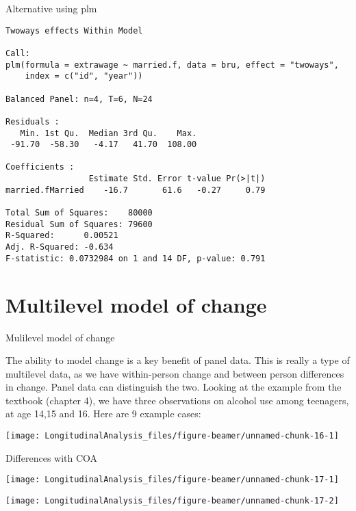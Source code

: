 \documentclass[10pt,ignorenonframetext,]{beamer}
\begin{document}
\begin{frame}[fragile]{Alternative using plm}

\begin{verbatim}
Twoways effects Within Model

Call:
plm(formula = extrawage ~ married.f, data = bru, effect = "twoways", 
    index = c("id", "year"))

Balanced Panel: n=4, T=6, N=24

Residuals :
   Min. 1st Qu.  Median 3rd Qu.    Max. 
 -91.70  -58.30   -4.17   41.70  108.00 

Coefficients :
                 Estimate Std. Error t-value Pr(>|t|)
married.fMarried    -16.7       61.6   -0.27     0.79

Total Sum of Squares:    80000
Residual Sum of Squares: 79600
R-Squared:      0.00521
Adj. R-Squared: -0.634
F-statistic: 0.0732984 on 1 and 14 DF, p-value: 0.791
\end{verbatim}

\end{frame}

\section{Multilevel model of change}\label{multilevel-model-of-change}

\begin{frame}{Mulilevel model of change}

The ability to model change is a key benefit of panel data. This is
really a type of multilevel data, as we have within-person change and
between person differences in change. Panel data can distinguish the
two. Looking at the example from the textbook (chapter 4), we have three
observations on alcohol use among teenagers, at age 14,15 and 16. Here
are 9 example cases:

\begin{center}\texttt{[image: LongitudinalAnalysis\_files/figure-beamer/unnamed-chunk-16-1]} \end{center}

\end{frame}

\begin{frame}{Differences with COA}

\begin{center}\texttt{[image: LongitudinalAnalysis\_files/figure-beamer/unnamed-chunk-17-1]} \end{center}

\begin{center}\texttt{[image: LongitudinalAnalysis\_files/figure-beamer/unnamed-chunk-17-2]} \end{center}

\end{frame}
\end{document}
